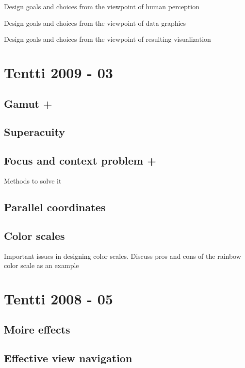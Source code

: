 \documentclass[a4paper]{article}
\begin{document}
Design goals and choices from the viewpoint of human perception

Design goals and choices from the viewpoint of data graphics

Design goals and choices from the viewpoint of resulting visualization



\section{Tentti 2009 - 03}

\subsection{Gamut +}

\subsection{Superacuity}

\subsection{Focus and context problem +}

Methods to solve it

\subsection{Parallel coordinates}

\subsection{Color scales}

Important issues in designing color scales. Discuss pros and cons of the rainbow color scale as an example

\section{Tentti 2008 - 05}

\subsection{Moire effects}

\subsection{Effective view navigation}
\end{document}
